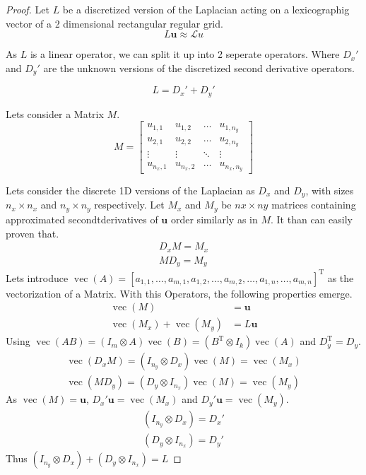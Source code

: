 \documentclass{article}
\begin{document}
\begin{proof}
    
Let $L$ be a discretized version of the Laplacian acting on a lexicographig vector of a 2 dimensional rectangular regular grid.
\begin{equation}
    L\mathbf{u} \approx \mathcal{L} u
\end{equation}

As $L$ is a linear operator, we can split it up into 2 seperate operators. Where $D_x'$ and $D_y'$ are the unknown versions of the discretized second derivative operators.

\begin{equation}
    L = D_x' + D_y'
\end{equation}

Lets consider a Matrix $M$.
\begin{equation}
    M = \begin{bmatrix}
        u_{1,1} & u_{1,2} & \dots & u_{1,n_y} \\
        u_{2,1} & u_{2,2} & \dots & u_{2,n_y} \\
        \vdots & \vdots & \ddots & \vdots \\
        u_{n_x,1} & u_{n_x,2} & \dots & u_{n_x,n_y}
    \end{bmatrix}
\end{equation}

Lets consider the discrete 1D versions of the Laplacian as $D_x$ and $D_y$, with sizes $n_x \times n_x$ and $n_y \times n_y$ respectively.
Let $M_x$ and $M_y$ be $nx\times ny$ matrices containing approximated secondtderivatives of $\mathbf{u}$ order similarly as in $M$. It than can easily proven that.
\begin{align}
    D_x M = M_x \\
    M D_y = M_y
\end{align}
Lets introduce $\operatorname{vec}(A)=\left[a_{1,1}, \ldots, a_{m, 1}, a_{1,2}, \ldots, a_{m, 2}, \ldots, a_{1, n}, \ldots, a_{m, n}\right]^{\mathrm{T}}$ as the vectorization of a Matrix. With this Operators, the following properties emerge.
\begin{align}
    \operatorname{vec}(M) &= \mathbf{u} \\
    \operatorname{vec}(M_x) + \operatorname{vec}(M_y) &= L\mathbf{u}
\end{align}
Using $\operatorname{vec}(A B)=\left(I_{m} \otimes A\right) \operatorname{vec}(B)=\left(B^{\mathrm{T}} \otimes I_{k}\right) \operatorname{vec}(A)$ and $D_y^{\mathrm{T}} = D_y$.
\begin{align}
    \operatorname{vec}(D_x M) = (I_{n_y} \otimes D_x)\operatorname{vec}(M) = \operatorname{vec}(M_x)\\
    \operatorname{vec}(M D_y) = (D_y \otimes I_{n_x})\operatorname{vec}(M) = \operatorname{vec}(M_y)
\end{align} 
As $\operatorname{vec}(M) = \mathbf{u}$, $D_x' \mathbf{u} = \operatorname{vec}(M_x)$ and $D_y' \mathbf{u} = \operatorname{vec}(M_y)$.
\begin{align}
    (I_{n_y} \otimes D_x) = D_x' \\
    (D_y \otimes I_{n_x}) = D_y'
\end{align}
Thus $(I_{n_y} \otimes D_x) + (D_y \otimes I_{n_x}) = L$
\end{proof}
\end{document}
